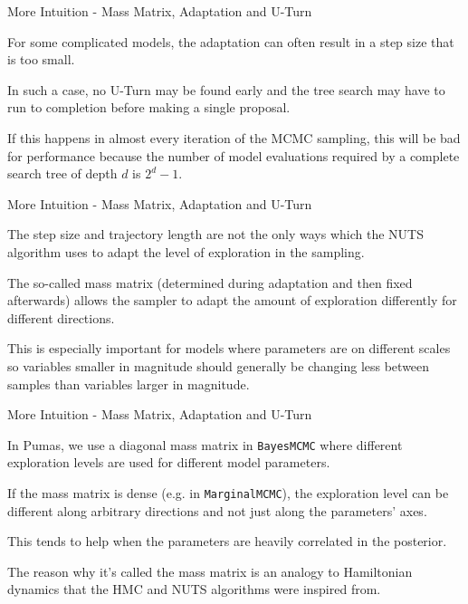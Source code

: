 \begin{frame}{More Intuition - Mass Matrix, Adaptation and U-Turn}
	\begin{vfilleditems}
		\item For some complicated models, the adaptation can often result in a step size that is too small.
		\item In such a case, no U-Turn may be found early and the tree search may have to run to completion before making a single proposal.
		\item If this happens in almost every iteration of the MCMC sampling, this will be bad for performance because the number of model evaluations required by a complete search tree of depth $d$ is $2^d - 1$.
	\end{vfilleditems}
\end{frame}

\begin{frame}{More Intuition - Mass Matrix, Adaptation and U-Turn}
	\begin{vfilleditems}
		\item The step size and trajectory length are not the only ways which the NUTS algorithm uses to adapt the level of exploration in the sampling.
		\item The so-called mass matrix (determined during adaptation and then fixed afterwards) allows the sampler to adapt the amount of exploration differently for different directions.
		\item This is especially important for models where parameters are on different scales so variables smaller in magnitude should generally be changing less between samples than variables larger in magnitude.
	\end{vfilleditems}
\end{frame}

\begin{frame}{More Intuition - Mass Matrix, Adaptation and U-Turn}
	\begin{vfilleditems}
		\item In Pumas, we use a diagonal mass matrix in \lstinline{BayesMCMC} where different exploration levels are used for different model parameters.
		\item If the mass matrix is dense (e.g. in \lstinline{MarginalMCMC}), the exploration level can be different along arbitrary directions and not just along the parameters' axes.
		\item This tends to help when the parameters are heavily correlated in the posterior.
		\item The reason why it's called the mass matrix is an analogy to Hamiltonian dynamics that the HMC and NUTS algorithms were inspired from.
	\end{vfilleditems}
\end{frame}

